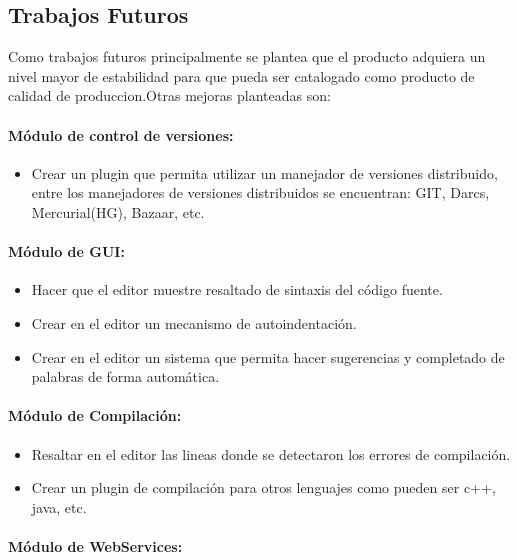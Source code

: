 \subsection{Trabajos Futuros}

Como trabajos futuros principalmente se plantea que el producto adquiera un nivel mayor de estabilidad para que pueda ser catalogado como producto de calidad de produccion.\newline Otras mejoras planteadas son:

\paragraph{Módulo de control de versiones:}

\begin{itemize}
	\item Crear un plugin que permita utilizar un manejador de versiones distribuido, entre los manejadores de versiones distribuidos se encuentran: GIT, Darcs, Mercurial(HG), Bazaar, etc.
\end{itemize}

\paragraph{Módulo de GUI:}

\begin{itemize}
	\item Hacer que el editor muestre resaltado de sintaxis del código fuente.
	\item Crear en el editor un mecanismo de autoindentación.
	\item Crear en el editor un sistema que permita hacer sugerencias y completado de palabras de forma automática.
\end{itemize}

\paragraph{Módulo de Compilación:}

\begin{itemize}
	\item Resaltar en el editor las lineas donde se detectaron los errores de compilación.
	\item Crear un plugin de compilación para otros lenguajes como pueden ser c++, java, etc.
\end{itemize}

\paragraph{Módulo de WebServices:}

